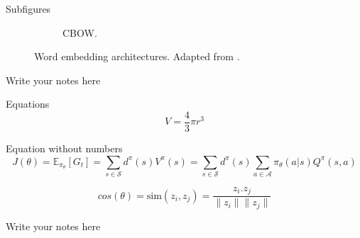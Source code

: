 \documentclass{beamer}
\begin{document}
\begin{frame}{Subfigures}
\begin{figure}
\begin{subfigure}{0.4\textwidth}
                \caption{CBOW.}
                \label{fig:second}
            \end{subfigure}
            \caption{Word embedding architectures. Adapted from \cite{mikolov2013efficient}.}
            \label{fig:word2vec_arquitecture}
        \end{figure}

        \begin{note}
            {Write your notes here}
        \end{note}
    \end{frame}

    \begin{frame}{Equations}
        \begin{equation}
            V = \frac{4}{3}\pi r^3
            \label{eq:vsphere}
        \end{equation}

        \begin{exampleblock}{Equation without numbers} 
            \begin{equation}
                J(\theta) = \mathbb{E}_{\pi_\theta}[G_t] = \sum_{s\in\mathcal{S}} d^\pi (s)V^\pi(s)=\sum_{s\in\mathcal{S}} d^\pi(s)\sum_{a\in\mathcal{A}}\pi_\theta(a|s)Q^\pi(s,a)
                \label{eq:train}
            \end{equation}
        \end{exampleblock}

        \begin{equation}
            cos(\theta) = \text{sim}(z_i, z_j) = \frac{z_i.z_j}{\|z_i\|\|z_j\|}
            \label{eq:cosine_similarity}
        \end{equation}
            
        \begin{note}
            {Write your notes here}
        \end{note}
    \end{frame}
\end{document}
